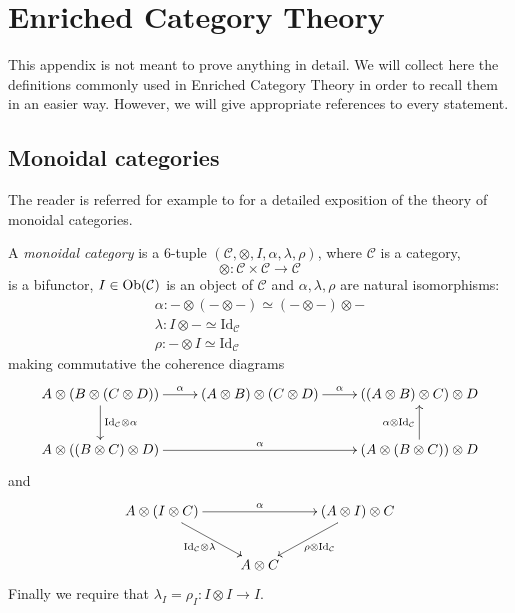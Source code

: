 \chapter{Enriched Category Theory}

\begin{refsection}

This appendix is not meant to prove anything in detail. We will collect here the definitions commonly used in Enriched Category Theory in order to recall them in an easier way. However, we will give appropriate references to every statement.

\section{Monoidal categories}

The reader is referred for example to \cite[Ch. VII]{cwm} for a detailed exposition of the theory of monoidal categories.

\begin{defin}
A \emph{monoidal category} is a 6-tuple $(\mathcal C, \otimes, I, \alpha, \lambda, \rho)$, where $\mathcal C$ is a category,
\[
\otimes \colon \mathcal C \times \mathcal C \to \mathcal C
\]
is a bifunctor, $I \in \mathrm{Ob}(\mathcal C)$ is an object of $\mathcal C$ and $\alpha, \lambda, \rho$ are natural isomorphisms:
\begin{gather*}
\alpha \colon - \otimes (- \otimes -) \simeq (- \otimes -) \otimes - \\
\lambda \colon I \otimes - \simeq \mathrm{Id}_{\mathcal C} \\
\rho \colon - \otimes I \simeq \mathrm{Id}_{\mathcal C}
\end{gather*}
making commutative the coherence diagrams
\[
\xymatrix{
A \otimes (B \otimes (C \otimes D)) \ar[d]^{\mathrm{Id}_{\mathcal C} \otimes \alpha} \ar[r]^-\alpha & (A \otimes B) \otimes (C \otimes D) \ar[r]^\alpha & ((A \otimes B) \otimes C) \otimes D \\ A \otimes ((B \otimes C) \otimes D) \ar[rr]^\alpha & & (A \otimes (B \otimes C)) \otimes D \ar[u]^{\alpha \otimes \mathrm{Id}_{\mathcal C}}
}
\]
and
\[
\xymatrix{
A \otimes (I \otimes C) \ar[rr]^-\alpha  \ar[dr]_{\mathrm{Id}_{\mathcal C} \otimes \lambda} & & (A \otimes I) \otimes C \ar[dl]^{\rho \otimes \mathrm{Id}_{\mathcal C}} \\ & A \otimes C
}
\]
Finally we require that $\lambda_I = \rho_I \colon I \otimes I \to I$.
\end{defin}


\end{refsection}
